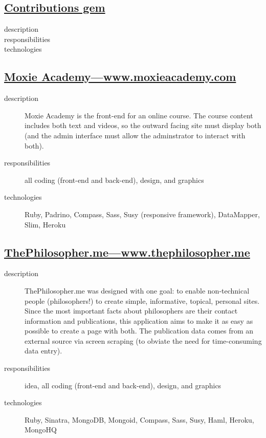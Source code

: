 \documentclass{article}
\begin{document}
\begin{multicols}{2}

\subsection{\href{}
  {Contributions gem}}
\label{sub:Joy Tanksley's Coaching Site}

\begin{description}
  \item[description]
  \item[responsibilities]
  \item[technologies]
\end{description}


\subsection{\href{http://www.moxieacademy.com}{Moxie Academy---www.moxieacademy.com}}
\label{sub:Moxie Academy}

\begin{description}
  \item[description] Moxie Academy is the front-end for an online 
    course.  The course content includes both text and videos, so the 
    outward facing site must display both (and the admin interface 
    must allow the adminstrator to interact with both).
  \item[responsibilities] all coding (front-end and back-end), design, and graphics
  \item[technologies] Ruby, Padrino, Compass, Sass, Susy (responsive framework), DataMapper, Slim, Heroku
\end{description}


\subsection{\href{http://www.thephilosopher.me}
  {ThePhilosopher.me---www.thephilosopher.me}}
\label{sub:ThePhilosopher}

\begin{description}
  \item[description] ThePhilosopher.me was designed with one goal: to 
    enable non-technical people (philosophers!) to create simple, 
    informative, topical, personal sites.  Since the most important 
    facts about philosophers are their contact information and 
    publications, this application aims to make it as easy as possible 
    to create a page with both.  The publication data comes from an 
    external source via screen scraping (to obviate the need for 
    time-consuming data entry).
  \item[responsibilities] idea, all coding (front-end and back-end), 
    design, and graphics
  \item[technologies] Ruby, Sinatra, MongoDB, Mongoid, Compass, Sass, 
    Susy, Haml, Heroku, MongoHQ
\end{description}


\end{multicols}
\end{document}
